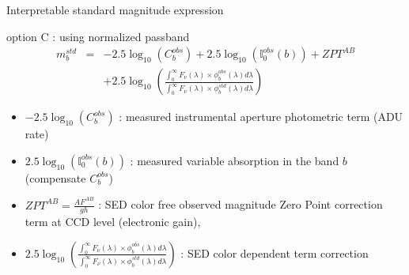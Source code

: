 \documentclass{beamer}
\begin{document}
\begin{frame}{Interpretable standard magnitude expression}
\begin{alertblock}{option C : using normalized passband}
\begin{eqnarray}
m_b^{std} & = &  -2.5 \log_{10}(C_b^{obs})+ 2.5 \log_{10}\left(\mathbb{I}_0^{obs}(b)\right) + ZPT^{AB}   \nonumber \\
 & & + 2.5 \log_{10} 
	\left( 
	\frac{\int_0^\infty F_\nu(\lambda) \times \phi_b^{obs}(\lambda) d\lambda }{\int_0^\infty F_\nu(\lambda) \times \phi_b^{std}(\lambda) d\lambda} 
	\right)
\end{eqnarray}
\end{alertblock}
\begin{itemize}
\item $-2.5 \log_{10}(C_b^{obs})$ : measured instrumental aperture photometric term (ADU rate)
\item $2.5 \log_{10}\left(\mathbb{I}_0^{obs}(b)\right)$ : measured variable absorption in the band $b$ (compensate $C_b^{obs}$)
\item $ZPT^{AB} = \frac{A F^{AB}}{gh}$ :  SED color free observed magnitude Zero Point correction term at CCD level (electronic gain),
\item $2.5 \log_{10} 
	\left( 
	\frac{\int_0^\infty F_\nu(\lambda) \times \phi_b^{obs}(\lambda) d\lambda}{\int_0^\infty F_\nu(\lambda) \times \phi_b^{std}(\lambda) d\lambda}\right)$ : SED color dependent term correction
\end{itemize}
\end{frame}
\end{document}
